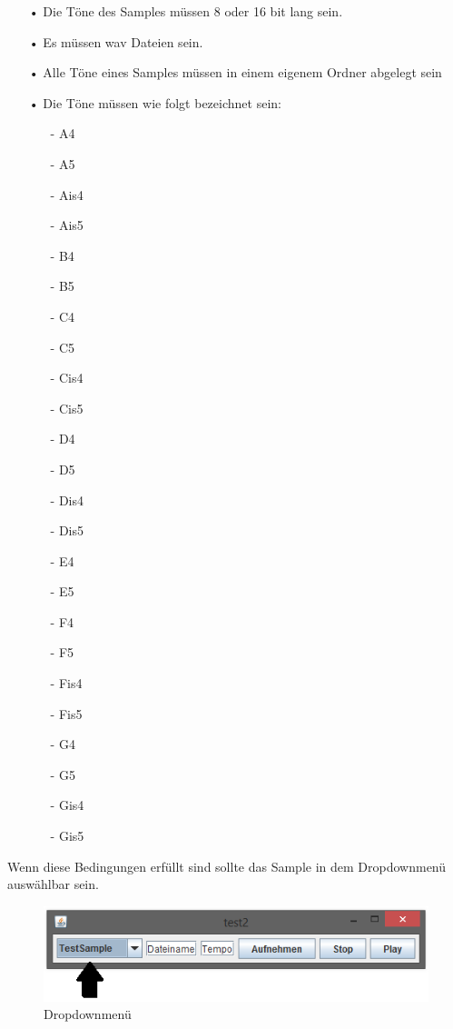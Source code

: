  \begin{itemize}
   \item[•] Die Töne des Samples müssen 8 oder 16 bit lang sein.
   \item[•] Es müssen wav Dateien sein.
   \item[•] Alle Töne eines Samples müssen in einem eigenem Ordner abgelegt sein
   \item[•] Die Töne müssen wie folgt bezeichnet sein:
   			\begin{itemize}
   			
   				\item[-] A4
   				\item[-] A5
   				\item[-] Ais4
   				\item[-] Ais5
   				\item[-] B4
   				\item[-] B5
   				\item[-] C4
   				\item[-] C5
   				\item[-] Cis4 
   				\item[-] Cis5
   				\item[-] D4
   				\item[-] D5
   				\item[-] Dis4
   				\item[-] Dis5
   				\item[-] E4
   				\item[-] E5
   				\item[-] F4
   				\item[-] F5
   				\item[-] Fis4
   				\item[-] Fis5
   				\item[-] G4
   				\item[-] G5
   				\item[-] Gis4
   				\item[-] Gis5
   				   				
   			\end{itemize}
   	
   
 \end{itemize}            
             
\newpage

     Wenn diese Bedingungen erfüllt sind sollte das Sample in dem Dropdownmenü auswählbar sein.
     
     \begin{figure}[hbtp]
     \centering
     \includegraphics[scale=1]{Bilder/SampleDropdown.PNG}
     \caption{Dropdownmenü}
     \end{figure}
     
